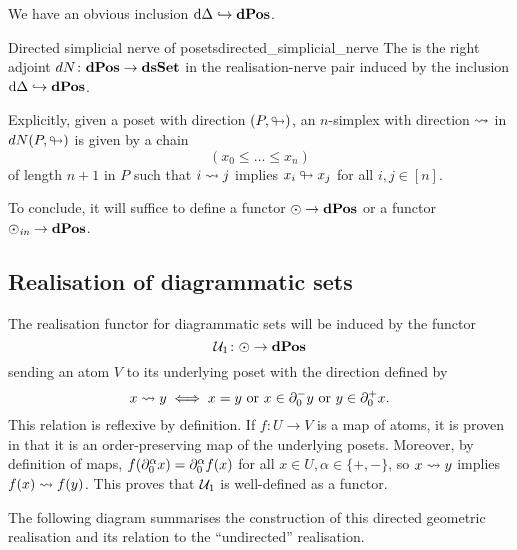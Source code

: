 We have an obvious inclusion \( \mathrm{d}\Delta \hookrightarrow \mathbf{dPos} \).

\begin{cdef}{Directed simplicial nerve of posets}{directed_simplicial_nerve}
	The  is the right adjoint \( dN\colon \mathbf{dPos} \to \mathbf{dsSet} \) in the realisation-nerve pair induced by the inclusion \( \mathrm{d}\Delta \hookrightarrow \mathbf{dPos} \).
\end{cdef}

Explicitly, given a poset with direction \( (P, \looparrowright) \), an \( n \)-simplex with direction \( \rightsquigarrow \) in \( dN(P, \looparrowright) \) is given by a chain
\begin{equation*}
	(x_0 \leq \ldots \leq x_n)
\end{equation*}
of length \( n+1 \) in \( P \) such that \( i \rightsquigarrow j \) implies \( x_i \looparrowright x_j \) for all \( i, j \in [n] \).

To conclude, it will suffice to define a functor \( \odot \to \mathbf{dPos} \) or a functor \( \odot_\textit{in} \to \mathbf{dPos} \).


\subsection{Realisation of diagrammatic sets}

The realisation functor for diagrammatic sets will be induced by the functor
\begin{equation*}
	\mathcal{U}_1\colon \odot \to \mathbf{dPos}
\end{equation*}
sending an atom \( V \) to its underlying poset with the direction defined by
\begin{equation*}
	x \rightsquigarrow y \iff x = y \text{ or } x \in \partial_{0}^{-}y \text{ or } y \in \partial_{0}^{+}x.
\end{equation*}
This relation is reflexive by definition.
If \( f\colon U \to V \) is a map of atoms, it is proven in \cite[Lemma 1.9]{hadzihasanovic_diagrammatic_2020} that it is an order-preserving map of the underlying posets.
Moreover, by definition of maps, \( f(\partial_{0}^{\alpha}x) = \partial_{0}^{\alpha}f(x) \) for all \( x \in U, \alpha \in \{ +, - \} \), so \( x \rightsquigarrow y \) implies \( f(x) \rightsquigarrow f(y) \).
This proves that \( \mathcal{U}_1 \) is well-defined as a functor.

The following diagram summarises the construction of this directed geometric realisation and its relation to the ``undirected'' realisation.

